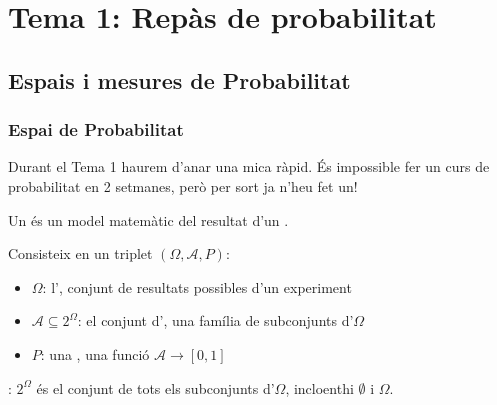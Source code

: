 \documentclass[letterpaper,10pt,english]{sphinxmanual}
\begin{document}
\chapter{Tema 1: Repàs de probabilitat}
\label{\detokenize{0_Intro/0_1_Repas_probabilitat:tema-1-repas-de-probabilitat}}\label{\detokenize{0_Intro/0_1_Repas_probabilitat::doc}}

\section{Espais i mesures de Probabilitat}
\label{\detokenize{0_Intro/0_1_Repas_probabilitat:espais-i-mesures-de-probabilitat}}

\subsection{Espai de Probabilitat}
\label{\detokenize{0_Intro/0_1_Repas_probabilitat:espai-de-probabilitat}}
Durant el Tema 1 haurem d’anar una mica ràpid. És impossible fer un curs de probabilitat
en 2 setmanes, però per sort ja n’heu fet un!

Un  és un model matemàtic del resultat d’un .

Consisteix en un triplet \(\left(\Omega, \mathcal{A}, P\right)\):
\begin{itemize}
\item {} 
\(\Omega\): l’, conjunt de resultats possibles d’un experiment

\item {} 
\(\mathcal{A} \subseteq 2^{\Omega}\): el conjunt d’, una família de subconjunts d’\(\Omega\)

\item {} 
\(P\): una , una funció \(\mathcal{A} \rightarrow \left[0, 1\right]\)

\end{itemize}

: \(2^{\Omega}\) és el conjunt de tots els sub\sphinxhyphen{}conjunts d’\(\Omega\), incloent\sphinxhyphen{}hi \(\emptyset\) i \(\Omega\).
\end{document}
